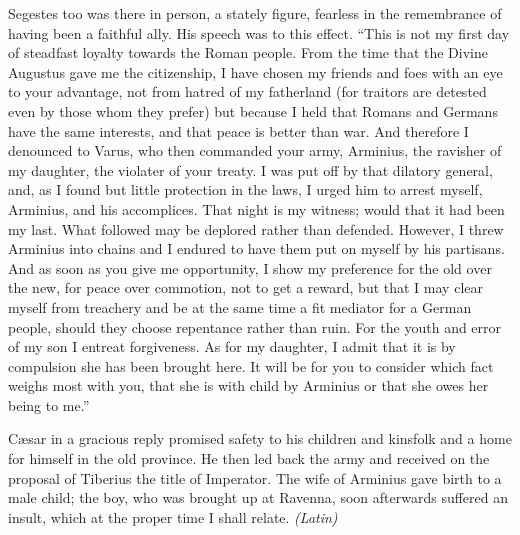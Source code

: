Segestes too was there in person, a stately figure, fearless in the remembrance of having been a faithful ally. His speech was to this effect. ``This is not my first day of steadfast loyalty towards the Roman people. From the time that the Divine Augustus gave me the citizenship, I have chosen my friends and foes with an eye to your advantage, not from hatred of my fatherland (for traitors are detested even by those whom they prefer) but because I held that Romans and Germans have the same interests, and that peace is better than war. And therefore I denounced to Varus, who then commanded your army, Arminius, the ravisher of my daughter, the violater of your treaty. I was put off by that dilatory general, and, as I found but little protection in the laws, I urged him to arrest myself, Arminius, and his accomplices. That night is my witness; would that it had been my last. What followed may be deplored rather than defended. However, I threw Arminius into chains and I endured to have them put on myself by his partisans. And as soon as you give me opportunity, I show my preference for the old over the new, for peace over commotion, not to get a reward, but that I may clear myself from treachery and be at the same time a fit mediator for a German people, should they choose repentance rather than ruin. For the youth and error of my son I entreat forgiveness. As for my daughter, I admit that it is by compulsion she has been brought here. It will be for you to consider which fact weighs most with you, that she is with child by Arminius or that she owes her being to me.''

Cæsar in a gracious reply promised safety to his children and kinsfolk and a home for himself in the old province. He then led back the army and received on the proposal of Tiberius the title of Imperator. The wife of Arminius gave birth to a male child; the boy, who was brought up at Ravenna, soon afterwards suffered an insult, which at the proper time I shall relate. \emph{(Latin)}


